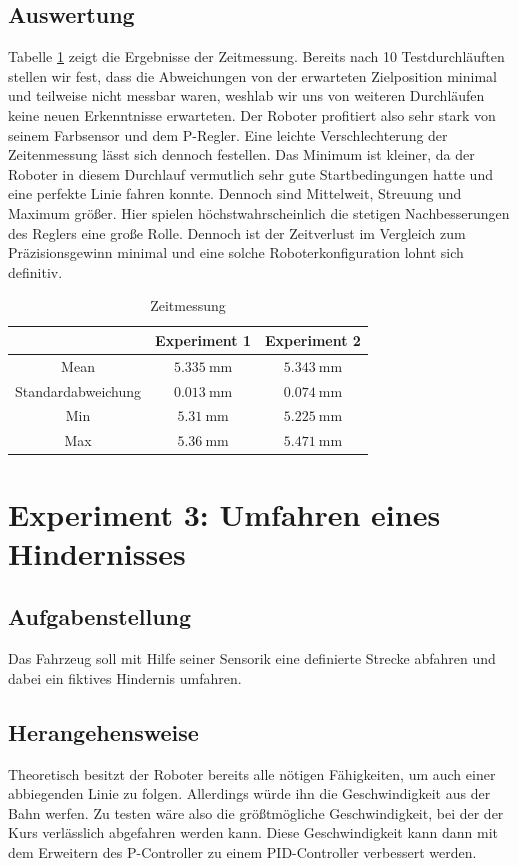 \documentclass[ngerman]{tudscrreprt}
\begin{document}
\subsection{Auswertung}
Tabelle \ref{table:zeitmessung2} zeigt die Ergebnisse der Zeitmessung. Bereits nach 10
Testdurchläuften stellen wir fest, dass die Abweichungen von der erwarteten Zielposition
minimal und teilweise nicht messbar waren, weshlab wir uns von weiteren Durchläufen keine
neuen Erkenntnisse erwarteten. Der Roboter profitiert also sehr stark von seinem
Farbsensor und dem P-Regler. Eine leichte Verschlechterung der Zeitenmessung lässt sich 
dennoch festellen. Das Minimum ist kleiner, da der Roboter in diesem Durchlauf vermutlich
sehr gute Startbedingungen hatte und eine perfekte Linie fahren konnte. Dennoch sind
Mittelweit, Streuung und Maximum größer. Hier spielen höchstwahrscheinlich die stetigen
Nachbesserungen des Reglers eine große Rolle. Dennoch ist der Zeitverlust im Vergleich
zum Präzisionsgewinn minimal und eine solche Roboterkonfiguration lohnt sich definitiv.
%
\begin{table}[H]
    \centering
    \begin{tabular}{|c|c|c|}
    \hline
                       & Experiment 1      & Experiment 2      \\ \hline
    Mean               & $\SI{5,335}{\mm}$ & $\SI{5,343}{\mm}$ \\ \hline
    Standardabweichung & $\SI{0,013}{\mm}$ & $\SI{0,074}{\mm}$ \\ \hline
    Min                & $\SI{5,31}{\mm}$  & $\SI{5,225}{\mm}$ \\ \hline
    Max                & $\SI{5,36}{\mm}$  & $\SI{5,471}{\mm}$ \\ \hline
    \end{tabular}
    \caption{Zeitmessung}
    \label{table:zeitmessung2}
\end{table}

\section{Experiment 3: Umfahren eines Hindernisses}
\subsection{Aufgabenstellung}
Das Fahrzeug soll mit Hilfe seiner Sensorik eine definierte Strecke abfahren und dabei ein
fiktives Hindernis umfahren.

\subsection{Herangehensweise}
Theoretisch besitzt der Roboter bereits alle nötigen Fähigkeiten, um auch einer
abbiegenden Linie zu folgen. Allerdings würde ihn die Geschwindigkeit aus der Bahn werfen.
Zu testen wäre also die größtmögliche Geschwindigkeit, bei der der Kurs verlässlich
abgefahren werden kann. Diese Geschwindigkeit kann dann mit dem Erweitern des P-Controller
zu einem PID-Controller verbessert werden.
\end{document}
